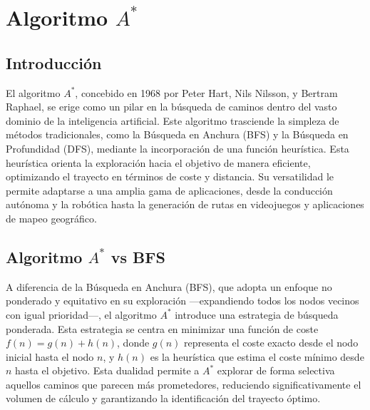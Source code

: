 \section{Algoritmo $A^{*}$}

\subsection*{Introducción}
El algoritmo $A^{*}$, concebido en 1968 por Peter Hart, Nils Nilsson, y Bertram Raphael, se erige como un pilar en la búsqueda de caminos dentro del vasto dominio de la inteligencia artificial. Este algoritmo trasciende la simpleza de métodos tradicionales, como la Búsqueda en Anchura (BFS) y la Búsqueda en Profundidad (DFS), mediante la incorporación de una función heurística. Esta heurística orienta la exploración hacia el objetivo de manera eficiente, optimizando el trayecto en términos de coste y distancia. Su versatilidad le permite adaptarse a una amplia gama de aplicaciones, desde la conducción autónoma y la robótica hasta la generación de rutas en videojuegos y aplicaciones de mapeo geográfico.
\subsection*{Algoritmo $A^{*}$ vs BFS}
A diferencia de la Búsqueda en Anchura (BFS), que adopta un enfoque no ponderado y equitativo en su exploración —expandiendo todos los nodos vecinos con igual prioridad—, el algoritmo $A^{*}$ introduce una estrategia de búsqueda ponderada. Esta estrategia se centra en minimizar una función de coste \(f(n) = g(n) + h(n)\), donde \(g(n)\) representa el coste exacto desde el nodo inicial hasta el nodo \(n\), y \(h(n)\) es la heurística que estima el coste mínimo desde \(n\) hasta el objetivo. Esta dualidad permite a $A^{*}$ explorar de forma selectiva aquellos caminos que parecen más prometedores, reduciendo significativamente el volumen de cálculo y garantizando la identificación del trayecto óptimo.
